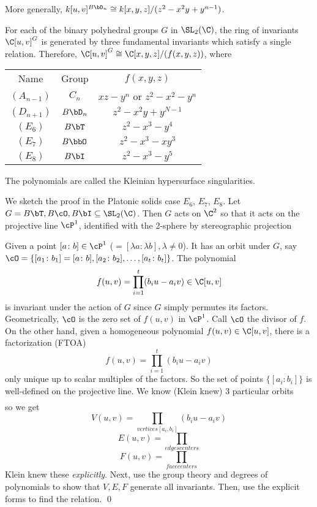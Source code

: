 More generally, $k[u,v]^{B\bD_n} \cong k[x,y,z]/(z^2-x^2y+y^{n-1})$.


\begin{thm}[Klein, 1884]
For each of the binary polyhedral groups $G$ in $\SL_2(\C)$, the ring of invariants $\C[u,v]^G$ is generated by three fundamental invariants which satisfy a single relation. Therefore, $\C[u,v]^G \cong \C[x,y,z]/(f(x,y,z))$, where
	\begin{table}[htbp]
	\centering
	\begin{tabular}{ccc}
	Name & Group & $f(x,y,z)$ \\
	$(A_{n-1})$ & $C_n$ & $xz-y^n$ or $z^2-x^2-y^n$ \\
	$(D_{n+1})$ & $B\bD_n$ & $z^2-x^2y+y^{N-1}$ \\
	$(E_6)$ & $B\bT$ & $z^2-x^3-y^4$ \\
	$(E_7)$ & $B\bbO$ & $z^2-x^3-xy^3$ \\
	$(E_8)$ & $B\bI$ & $z^2-x^3-y^5$
	\end{tabular}
	\end{table}
The polynomials are called the Kleinian hypersurface singularities.
\end{thm}


\pfsk We sketch the proof in the Platonic solids case $E_6$, $E_7$, $E_8$. Let $G= B \bT, B\cO, B\bI \subseteq \SL_2(\C)$. Then $G$ acts on $\C^2$ so that it acts on the projective line $\cP^1$, identified with the 2-sphere by stereographic projection


Given a point $[a\colon b] \in \cP^1$ ($=[\lambda a \colon \lambda b], \lambda \neq 0$). It has an orbit under $G$, say $\cO=\{ [a_1\colon b_1] = [a \colon b], [a_2 \colon b_2], \ldots, [a_t \colon b_t]\}$. The polynomial
	\[
	f(u,v)= \prod_{i=1}^t (b_iu - a_iv) \in \C[u,v]
	\] 
is invariant under the action of $G$ since $G$ simply permutes its factors. Geometrically, $\cO$ is the zero set of $f(u,v)$ in $\cP^1$. Call $\cO$ the divisor of $f$. On the other hand, given a homogeneous polynomial $f(u,v) \in \C[u,v]$, there is a factorization (FTOA)
	\[
	f(u,v)= \prod_{i=1}^t (b_iu-a_iv)
	\]
only unique up to scalar multiples of the factors. So the set of points $\{[a_i \colon b_i]\}$ is well-defined on the projective line. We know (Klein knew) 3 particular orbits
	\[
	\begin{split}
	\end{split}
	\]
so we get 
	\[
	V(u,v)= \prod_{vertices [a_i,b_i]} (b_iu-a_iv)
	\]
	\[
	E(u,v)= \prod_{edges centers}
	\]
	\[
	F(u,v)= \prod_{face centers}
	\]
Klein knew these \emph{explicitly}. Next, use the group theory and degrees of polynomials to show that $V,E,F$ generate all invariants. Then, use the explicit forms to find the relation. \qed \\

